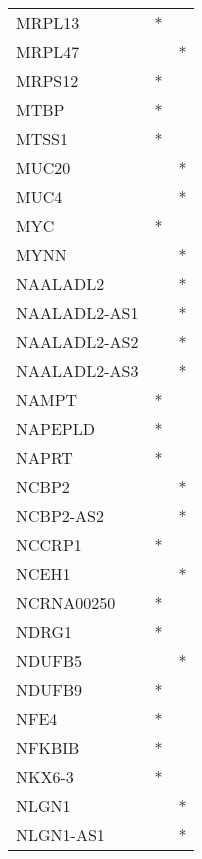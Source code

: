 \begin{longtable}{lcc}
MRPL13           &              * &            \\
MRPL47           &                &          * \\
MRPS12           &              * &            \\
MTBP             &              * &            \\
MTSS1            &              * &            \\
MUC20            &                &          * \\
MUC4             &                &          * \\
MYC              &              * &            \\
MYNN             &                &          * \\
NAALADL2         &                &          * \\
NAALADL2-AS1     &                &          * \\
NAALADL2-AS2     &                &          * \\
NAALADL2-AS3     &                &          * \\
NAMPT            &              * &            \\
NAPEPLD          &              * &            \\
NAPRT            &              * &            \\
NCBP2            &                &          * \\
NCBP2-AS2        &                &          * \\
NCCRP1           &              * &            \\
NCEH1            &                &          * \\
NCRNA00250       &              * &            \\
NDRG1            &              * &            \\
NDUFB5           &                &          * \\
NDUFB9           &              * &            \\
NFE4             &              * &            \\
NFKBIB           &              * &            \\
NKX6-3           &              * &            \\
NLGN1            &                &          * \\
NLGN1-AS1        &                &          * \\

\end{longtable}
